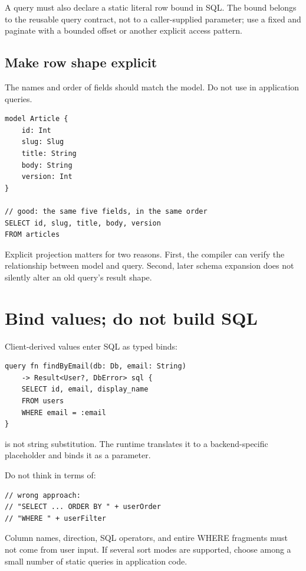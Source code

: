 A  query must also declare a static literal row bound in SQL. The bound belongs to the reusable query contract, not to a caller-supplied  parameter; use a fixed  and paginate with a bounded offset or another explicit access pattern.

\subsection*{Make row shape explicit}

The names and order of  fields should match the model. Do not use  in application queries.

\begin{lstlisting}[language=RWLang]
model Article {
    id: Int
    slug: Slug
    title: String
    body: String
    version: Int
}

// good: the same five fields, in the same order
SELECT id, slug, title, body, version
FROM articles
\end{lstlisting}

Explicit projection matters for two reasons. First, the compiler can verify the relationship between model and query. Second, later schema expansion does not silently alter an old query's result shape.

\section{Bind values; do not build SQL}

Client-derived values enter SQL as typed binds:

\begin{lstlisting}[language=RWLang]
query fn findByEmail(db: Db, email: String)
    -> Result<User?, DbError> sql {
    SELECT id, email, display_name
    FROM users
    WHERE email = :email
}
\end{lstlisting}

 is not string substitution. The runtime translates it to a backend-specific placeholder and binds it as a parameter.

Do not think in terms of:

\begin{lstlisting}
// wrong approach:
// "SELECT ... ORDER BY " + userOrder
// "WHERE " + userFilter
\end{lstlisting}

Column names,  direction, SQL operators, and entire WHERE fragments must not come from user input. If several sort modes are supported, choose among a small number of static queries in application code.

